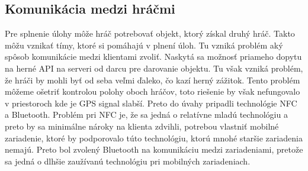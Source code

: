 \subsection{Komunikácia medzi hráčmi}
Pre splnenie úlohy môže hráč potrebovať objekt, ktorý získal druhý hráč. Takto môžu vznikať tímy, ktoré si pomáhajú v plnení úloh. Tu vzniká problém aký spôsob komunikácie medzi klientami zvoliť. Naskytá sa možnosť priameho dopytu na herné API na serveri od darcu pre darovanie objektu. Tu však vzniká problém, že hráči by mohli byť od seba veľmi ďaleko, čo kazí herný zážitok. Tento problém môžeme ošetriť kontrolou polohy oboch hráčov, toto riešenie by však nefungovalo v priestoroch kde je GPS signal slabší. Preto do úvahy pripadli technológie NFC a Bluetooth. Problém pri NFC je, že sa jedná o relatívne mladú technológiu a preto by sa minimálne nároky na klienta zdvihli, potrebou vlastniť mobilné zariadenie, ktoré by podporovalo túto technológiu, ktorú mnohé staršie zariadenia nemajú. Preto bol zvolený Bluetooth na komunikáciu medzi zariadeniami, pretože sa jedná o dlhšie zaužívanú technológiu pri mobilných zariadeniach.



